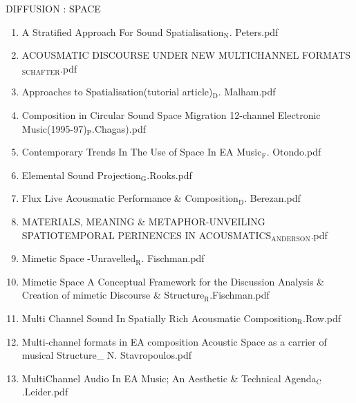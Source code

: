 \documentclass[11pt]{article}
\begin{document}
\item DIFFUSION : SPACE
\label{sec-1-1-1-1-49-1-8}
\begin{enumerate}
\item A Stratified Approach For Sound Spatialisation$_{\text{N}}$. Peters.pdf
\label{sec-1-1-1-1-49-1-8-1}

\item ACOUSMATIC DISCOURSE UNDER NEW MULTICHANNEL FORMATS$_{\text{SCHAFTER}}$.pdf
\label{sec-1-1-1-1-49-1-8-2}

\item Approaches to Spatialisation(tutorial article)$_{\text{D}}$. Malham.pdf
\label{sec-1-1-1-1-49-1-8-3}

\item Composition in Circular Sound Space Migration 12-channel Electronic Music(1995-97)$_{\text{P}}$.Chagas).pdf
\label{sec-1-1-1-1-49-1-8-4}

\item Contemporary Trends In The Use of Space In EA Music$_{\text{F}}$. Otondo.pdf
\label{sec-1-1-1-1-49-1-8-5}

\item Elemental Sound Projection$_{\text{G}}$.Rooks.pdf
\label{sec-1-1-1-1-49-1-8-6}

\item Flux Live Acousmatic Performance \& Composition$_{\text{D}}$. Berezan.pdf
\label{sec-1-1-1-1-49-1-8-7}

\item MATERIALS, MEANING \& METAPHOR-UNVEILING SPATIOTEMPORAL PERINENCES IN ACOUSMATICS$_{\text{ANDERSON}}$.pdf
\label{sec-1-1-1-1-49-1-8-8}

\item Mimetic Space -Unravelled$_{\text{R}}$. Fischman.pdf
\label{sec-1-1-1-1-49-1-8-9}

\item Mimetic Space A Conceptual Framework for the Discussion Analysis \& Creation of mimetic Discourse \& Structure$_{\text{R}}$.Fischman.pdf
\label{sec-1-1-1-1-49-1-8-10}

\item Multi Channel Sound In Spatially Rich Acousmatic Composition$_{\text{R}}$.Row.pdf
\label{sec-1-1-1-1-49-1-8-11}

\item Multi-channel formats in EA composition Acoustic Space as a carrier of musical Structure\_ N. Stavropoulos.pdf
\label{sec-1-1-1-1-49-1-8-12}

\item MultiChannel Audio In EA Music; An Aesthetic \& Technical Agenda$_{\text{C}}$.Leider.pdf
\label{sec-1-1-1-1-49-1-8-13}


\end{enumerate}
\end{document}
